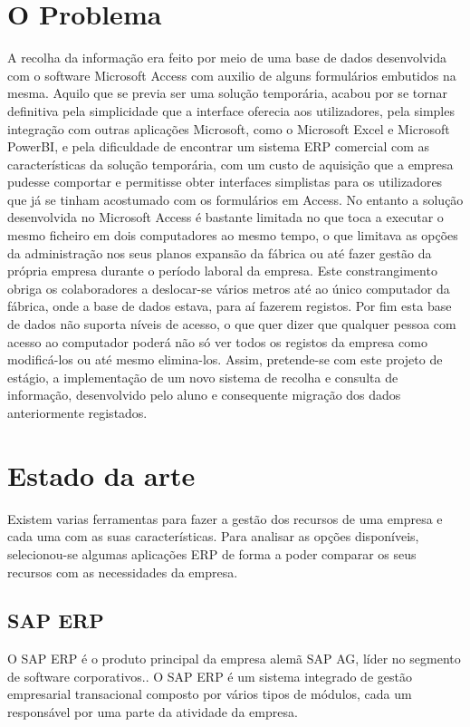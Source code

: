 \section{O Problema}
A recolha da informação era feito por meio de uma base de dados desenvolvida com o software Microsoft Access\label{sym:MS_ACCESS} com auxilio de alguns formulários embutidos na mesma. Aquilo que se previa ser uma solução temporária, acabou por se tornar definitiva pela simplicidade que a interface oferecia aos utilizadores, pela simples integração com outras aplicações Microsoft, como o Microsoft Excel\label{sym:MS_EXCEL} e Microsoft PowerBI\label{sym:MS_POWERBI}, e pela dificuldade de encontrar um sistema ERP\label{sym:ERP} comercial com as características da solução temporária, com um custo de aquisição que a empresa pudesse comportar e permitisse obter interfaces simplistas para os utilizadores que já se tinham acostumado com os formulários em Access.
No entanto a solução desenvolvida no Microsoft Access é bastante limitada no que toca a executar o mesmo ficheiro em dois computadores ao mesmo tempo, o que limitava as opções da administração nos seus planos expansão da fábrica ou até fazer gestão da própria empresa durante o período laboral da empresa. Este constrangimento obriga os colaboradores a deslocar-se vários metros até ao único computador da fábrica, onde a base de dados estava, para aí fazerem registos. Por fim esta base de dados não suporta níveis de acesso, o que quer dizer que qualquer pessoa com acesso ao computador poderá não só ver todos os registos da empresa como modificá-los ou até mesmo elimina-los. Assim, pretende-se com este projeto de estágio, a implementação de um novo sistema de recolha e consulta de informação, desenvolvido pelo aluno e consequente migração dos dados anteriormente registados.

\section{Estado da arte}
Existem varias ferramentas para fazer a gestão dos recursos de uma empresa e cada uma com as suas características. Para analisar as opções disponíveis, selecionou-se algumas aplicações ERP de forma a poder comparar os seus recursos com as necessidades da empresa.

\subsection{SAP ERP}
O SAP ERP é o produto principal da empresa alemã SAP AG, líder no segmento de software corporativos.\cite{Wikipediab}. O SAP ERP é um sistema integrado de gestão empresarial transacional composto por vários tipos de módulos, cada um responsável por uma parte da atividade da empresa.


